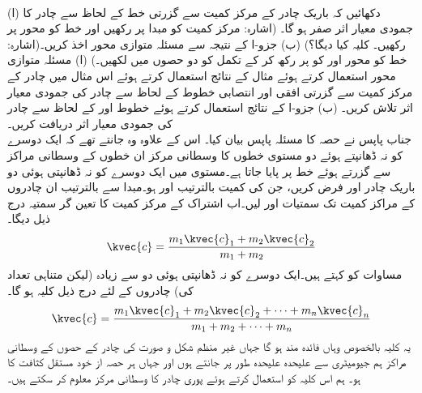 \\
(ا) دکھائیں کہ باریک چادر کے مرکز کمیت سے گزرتی خط کے لحاظ سے  چادر کا جمودی معیار اثر صفر ہو گا۔ (اشارہ: مرکز کمیت کو مبدا پر رکھیں اور  خط کو محور  پر رکھیں۔ کلیہ  کیا دیگا؟) (ب)  جزو-ا کے نتیجہ سے مسئلہ متوازی محور  اخذ کریں۔(اشارہ:  خط  کو محور  اور  کو  پر رکھ کر  کے تکمل کو دو حصوں میں  لکھیں۔)
(ا) مسئلہ متوازی محور استعمال کرتے ہوئے مثال  کے نتائج استعمال کرتے ہوئے  اس مثال میں چادر کے مرکز کمیت سے گزرتی افقی اور انتصابی خطوط کے لحاظ سے چادر کی جمودی معیار اثر تلاش کریں۔ (ب) جزو-ا کے نتائج استعمال کرتے ہوئے خطوط  اور  کے لحاظ سے چادر کی جمودی معیار اثر دریافت کریں۔
\\
جناب پاپس نے حصہ   کا مسئلہ پاپس بیان کیا۔ اس کے علاوہ وہ جانتے تھے کہ  ایک دوسرے کو نہ ڈھانپتے ہوئے دو  مستوی خطوں  کا وسطانی مرکز ان خطوں کے وسطانی مراکز سے گزرتے ہوئے خط پر پایا جاتا ہے۔مستوی  میں ایک دوسرے کو نہ ڈھانپتی ہوئی   دو باریک چادر   اور  فرض کریں،  جن کی کمیت بالترتیب  اور  ہو۔مبدا سے بالترتیب  ان چادروں کے مراکز کمیت تک سمتیات     اور  لیں۔اب اشتراک  کے مرکز کمیت کا تعین گر سمتیہ  درج ذیل   دیگا۔
\begin{align}\label{مساوات_بالکثرت_کلیہ_پاپس}
\kvec{c}=\frac{m_1\kvec{c}_1+m_2\kvec{c}_2}{m_1+m_2}
\end{align}
مساوات  کو  کہتے ہیں۔ایک دوسرے کو نہ ڈھانپتی ہوئی دو سے زیادہ (لیکن متناہی تعداد کی)  چادروں کے لئے درج ذیل کلیہ ہو گا۔
\begin{align}\label{مساوات_بالکثرت_عمومی_کلیہ_پاپس}
\kvec{c}=\frac{m_1\kvec{c}_1+m_2\kvec{c}_2+\cdots+m_n\kvec{c}_n}{m_1+m_2+\cdots+m_n}
\end{align}
یہ کلیہ بالخصوص وہاں فائدہ مند ہو گا جہاں   غیر منظم  شکل و صورت کی چادر کے حصوں کے وسطانی مراکز ہم  جیومیٹری سے علیحدہ علیحدہ طور پر جانتے ہوں اور جہاں  ہر حصہ از خود  مستقل کثافت کا ہو۔ ہم اس کلیہ کو استعمال کرتے ہوئے پوری چادر کا وسطانی مرکز معلوم کر سکتے ہیں۔ 

